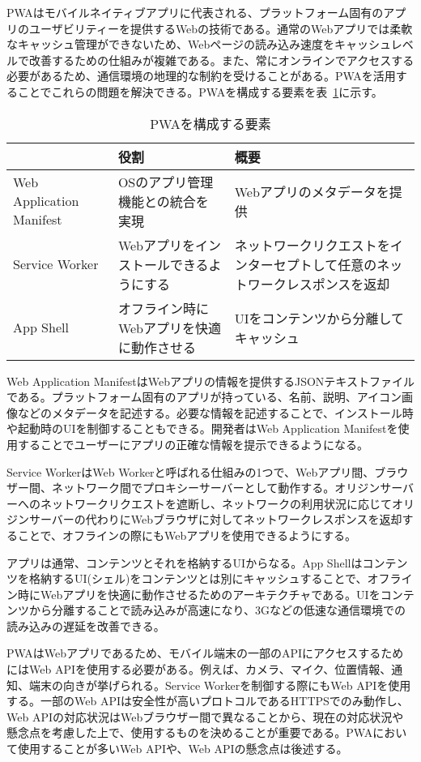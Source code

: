 PWAはモバイルネイティブアプリに代表される、プラットフォーム固有のアプリのユーザビリティーを提供するWebの技術である。通常のWebアプリでは柔軟なキャッシュ管理ができないため、Webページの読み込み速度をキャッシュレベルで改善するための仕組みが複雑である。また、常にオンラインでアクセスする必要があるため、通信環境の地理的な制約を受けることがある。PWAを活用することでこれらの問題を解決できる。PWAを構成する要素を表~\ref{table:PWAを構成する要素}に示す。
\begin{table}
    \centering
    \caption{PWAを構成する要素}
    \label{table:PWAを構成する要素}
    \begin{tabular}{|p{10em}|p{10em}|p{20em}|}
         \hline
         & 役割 & 概要 \\ \hline
         Web Application Manifest & OSのアプリ管理機能との統合を実現 & Webアプリのメタデータを提供 \\ \hline
         Service Worker & Webアプリをインストールできるようにする & ネットワークリクエストをインターセプトして任意のネットワークレスポンスを返却 \\ \hline
         App Shell & オフライン時にWebアプリを快適に動作させる & UIをコンテンツから分離してキャッシュ \\ \hline
    \end{tabular}
\end{table}

Web Application ManifestはWebアプリの情報を提供するJSONテキストファイルである。プラットフォーム固有のアプリが持っている、名前、説明、アイコン画像などのメタデータを記述する。必要な情報を記述することで、インストール時や起動時のUIを制御することもできる。開発者はWeb Application Manifestを使用することでユーザーにアプリの正確な情報を提示できるようになる。

Service WorkerはWeb Workerと呼ばれる仕組みの1つで、Webアプリ間、ブラウザー間、ネットワーク間でプロキシーサーバーとして動作する。オリジンサーバーへのネットワークリクエストを遮断し、ネットワークの利用状況に応じてオリジンサーバーの代わりにWebブラウザに対してネットワークレスポンスを返却することで、オフラインの際にもWebアプリを使用できるようにする。

アプリは通常、コンテンツとそれを格納するUIからなる。App Shellはコンテンツを格納するUI(シェル)をコンテンツとは別にキャッシュすることで、オフライン時にWebアプリを快適に動作させるためのアーキテクチャである。UIをコンテンツから分離することで読み込みが高速になり、3Gなどの低速な通信環境での読み込みの遅延を改善できる。

PWAはWebアプリであるため、モバイル端末の一部のAPIにアクセスするためにはWeb APIを使用する必要がある。例えば、カメラ、マイク、位置情報、通知、端末の向きが挙げられる。Service Workerを制御する際にもWeb APIを使用する。一部のWeb APIは安全性が高いプロトコルであるHTTPSでのみ動作し、Web APIの対応状況はWebブラウザー間で異なることから、現在の対応状況や懸念点を考慮した上で、使用するものを決めることが重要である。PWAにおいて使用することが多いWeb APIや、Web APIの懸念点は後述する。

